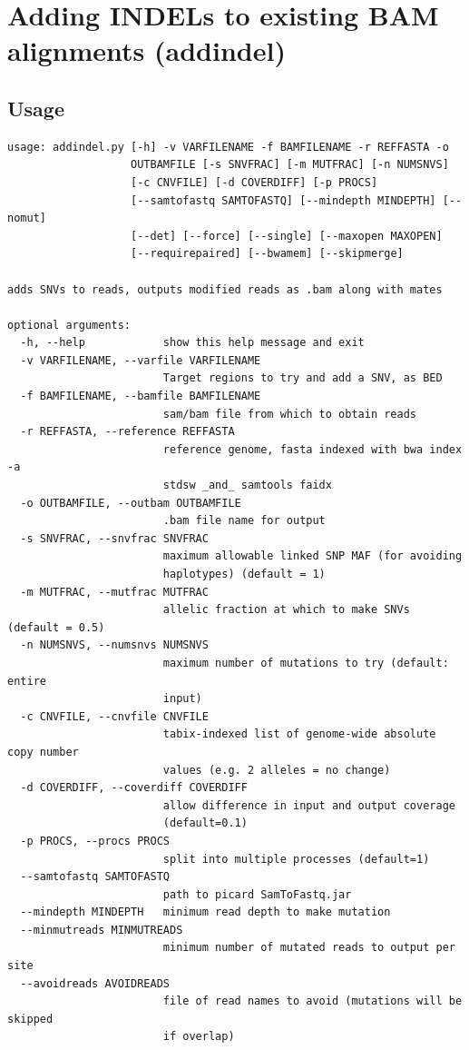 \documentclass[letterpaper,11pt]{article}
\begin{document}
\section{Adding INDELs to existing BAM alignments (addindel)}
\subsection{Usage}
\begin{verbatim}
usage: addindel.py [-h] -v VARFILENAME -f BAMFILENAME -r REFFASTA -o
                   OUTBAMFILE [-s SNVFRAC] [-m MUTFRAC] [-n NUMSNVS]
                   [-c CNVFILE] [-d COVERDIFF] [-p PROCS]
                   [--samtofastq SAMTOFASTQ] [--mindepth MINDEPTH] [--nomut]
                   [--det] [--force] [--single] [--maxopen MAXOPEN]
                   [--requirepaired] [--bwamem] [--skipmerge]

adds SNVs to reads, outputs modified reads as .bam along with mates

optional arguments:
  -h, --help            show this help message and exit
  -v VARFILENAME, --varfile VARFILENAME
                        Target regions to try and add a SNV, as BED
  -f BAMFILENAME, --bamfile BAMFILENAME
                        sam/bam file from which to obtain reads
  -r REFFASTA, --reference REFFASTA
                        reference genome, fasta indexed with bwa index -a
                        stdsw _and_ samtools faidx
  -o OUTBAMFILE, --outbam OUTBAMFILE
                        .bam file name for output
  -s SNVFRAC, --snvfrac SNVFRAC
                        maximum allowable linked SNP MAF (for avoiding
                        haplotypes) (default = 1)
  -m MUTFRAC, --mutfrac MUTFRAC
                        allelic fraction at which to make SNVs (default = 0.5)
  -n NUMSNVS, --numsnvs NUMSNVS
                        maximum number of mutations to try (default: entire
                        input)
  -c CNVFILE, --cnvfile CNVFILE
                        tabix-indexed list of genome-wide absolute copy number
                        values (e.g. 2 alleles = no change)
  -d COVERDIFF, --coverdiff COVERDIFF
                        allow difference in input and output coverage
                        (default=0.1)
  -p PROCS, --procs PROCS
                        split into multiple processes (default=1)
  --samtofastq SAMTOFASTQ
                        path to picard SamToFastq.jar
  --mindepth MINDEPTH   minimum read depth to make mutation
  --minmutreads MINMUTREADS
                        minimum number of mutated reads to output per site
  --avoidreads AVOIDREADS
                        file of read names to avoid (mutations will be skipped
                        if overlap)


\end{verbatim}
\end{document}
